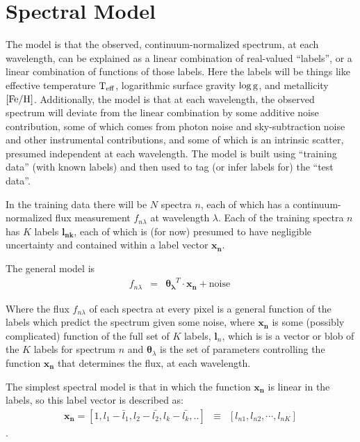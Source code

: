 \documentclass[12pt, preprint]{aastex}
\newcommand{\set}[1]{\bm{#1}}
\newcommand{\teff}{\mbox{$\rm T_{eff}$}}
\newcommand{\feh}{\mbox{$\rm [Fe/H]$}}
\newcommand{\logg}{\mbox{$\rm \log g$}}
\begin{document}




\section{Spectral Model}
\label{sec:spectralmodel}

The model is that the observed, continuum-normalized spectrum, at each
wavelength, can be explained as a linear combination of real-valued
``labels'', or a linear combination of functions of those labels.
Here the labels will be things like effective temperature $\teff$,
logarithmic surface gravity $\logg$, and metallicity $\feh$.
Additionally, the model is that at each wavelength, the observed
spectrum will deviate from the linear combination by some additive
noise contribution, some of which comes from photon noise and
sky-subtraction noise and other instrumental contributions, and some
of which is an intrinsic scatter, presumed independent at each
wavelength.
The model is built using ``training data'' (with known labels) and then
used to tag (or infer labels for) the ``test data''.

In the training data there will be $N$ spectra $n$, each of which has
a continuum-normalized flux measurement $f_{n\lambda}$ at wavelength
$\lambda$. Each of the training spectra $n$ has $K$ labels $\boldsymbol{l_{nk}}$, each of which
is (for now) presumed to have negligible uncertainty and contained within a label vector $\boldsymbol{x_n}$.

The general model is
\begin{eqnarray}
f_{n\lambda} &=&
\boldsymbol{\theta_\lambda}^T \cdot \boldsymbol{x_n} + \mbox{noise}
\
\end{eqnarray}

Where the flux $f_{n\lambda}$ of each spectra at every pixel is a general function of the labels which predict the spectrum given some noise, where $\boldsymbol{x_n}$ is some (possibly complicated) function of the full set of $K$ labels, $\set{l}_n$, which is is a vector or blob of the $K$ labels for spectrum $n$ and $\set{\theta}_\lambda$ is the set of parameters controlling the function $\boldsymbol{x_n}$ that determines the flux, at each wavelength.

The simplest spectral model is that in which the function $\boldsymbol{x_n}$ is
linear in the labels, so this label vector is described as:
\begin{eqnarray}
\set{x_n} =  [1, l_1 - \bar{l}_1, l_2 - \bar{l_2}, l_k - \bar{l_k}, .. ] &\equiv& [l_{n1}, l_{n2}, \cdots, l_{nK}]
\end{eqnarray}.
\end{document}
